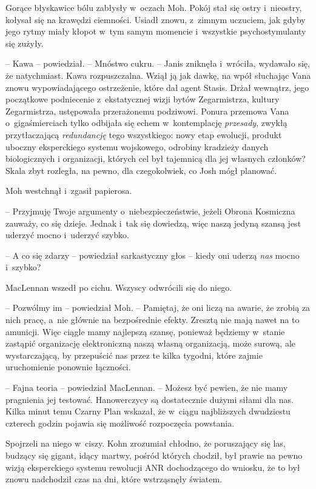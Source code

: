 \documentclass[oneside,polish,11pt,sfheadings]{mwbk}
\begin{document}
Gorące błyskawice bólu zabłysły w~oczach Moh. Pokój stał się ostry i~nieostry, kołysał się na krawędzi ciemności. Usiadł znowu, z~zimnym
uczuciem, jak gdyby jego rytmy miały kłopot w~tym samym momencie i~wszystkie psychostymulanty się zużyły.

-- Kawa -- powiedział. -- Mnóstwo cukru. -- Janis zniknęła i~wróciła,
wydawało się, że natychmiast. Kawa rozpuszczalna. Wziął ją jak dawkę, na
wpół słuchając Vana znowu wypowiadającego ostrzeżenie, które dał agent
Stasis. Drżał wewnątrz, jego początkowe podniecenie z~ekstatycznej wizji
bytów Zegarmistrza, kultury Zegarmistrza, ustępowała przerażonemu
podziwowi. Ponura przemowa Vana o~gigaśmierciach tylko odbijała się
echem w~kontemplację \emph{przesady}, zwykłą przytłaczającą
\emph{redundancję} tego wszystkiego: nowy etap ewolucji, produkt uboczny
eksperckiego systemu wojskowego, odrobiny kradzieży danych biologicznych
i organizacji, których cel był tajemnicą dla jej własnych członków?
Skala zbyt rozległa, na pewno, dla czegokolwiek, co Josh mógł planować.

Moh westchnął i~zgasił papierosa. 

-- Przyjmuję Twoje argumenty o~niebezpieczeństwie, jeżeli Obrona Kosmiczna zauważy, co się dzieje.
Jednak i~tak się dowiedzą, więc naszą jedyną szansą jest uderzyć mocno i~uderzyć szybko.

-- A co się zdarzy -- powiedział sarkastyczny głos -- kiedy oni uderzą
\emph{nas} mocno i~szybko?

MacLennan wszedł po cichu. Wszyscy odwrócili się do niego.

-- Pozwólmy im -- powiedział Moh. -- Pamiętaj, że oni liczą na awarie, że
zrobią za nich pracę, a~nie głównie na bezpośrednie efekty. Zresztą nie
mają nawet na to amunicji. Więc ciągle mamy najlepszą szansę, ponieważ
będziemy w~stanie zastąpić organizację elektroniczną naszą własną
organizacją, może surową, ale wystarczającą, by przepuścić nas przez te
kilka tygodni, które zajmie uruchomienie ponownie łączności.

-- Fajna teoria -- powiedział MacLennan. -- Możesz być pewien, że nie mamy
pragnienia jej testować. Hanowerczycy są dostatecznie dużymi siłami dla
nas. Kilka minut temu Czarny Plan wskazał, że w~ciągu najbliższych
dwudziestu czterech godzin pojawia się możliwość rozpoczęcia powstania.

Spojrzeli na niego w~ciszy. Kohn zrozumiał chłodno, że poruszający się
las, budzący się gigant, idący martwy, pośród których chodził, był
prawie na pewno wizją eksperckiego systemu rewolucji ANR dochodzącego do
wniosku, że to był znowu nadchodził czas na dni, które wstrząsnęły
światem.
\end{document}
